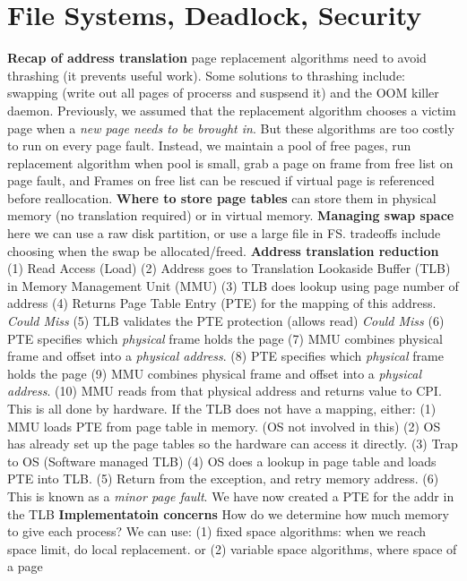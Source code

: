 \section{File Systems, Deadlock, Security}
{\bf Recap of address
translation}
page replacement algorithms need to avoid thrashing (it prevents useful work). Some solutions
to thrashing include: swapping (write out all pages of procerss and suspsend it) and the OOM killer daemon.
Previously, we assumed that the replacement algorithm chooses a victim page
when a \emph{new page needs to be brought in}. But these algorithms are too
costly to run on every page fault. Instead, we maintain a pool of free pages,
run replacement algorithm when pool is small, grab a page on frame from free
list on page fault, and Frames on free list can be rescued if virtual page is
referenced before reallocation.
{\bf Where to store page
tables } can store them in physical memory (no translation required) or in virtual memory.
{\bf Managing swap space} here we can use a raw disk partition, or use a large
file in FS. tradeoffs include choosing when the swap be allocated/freed.  {\bf
Address translation reduction} (1)  Read Access (Load)
  (2) Address goes to Translation Lookaside Buffer (TLB) in Memory
  Management Unit (MMU)
  (3) TLB does lookup using page number of address
  (4) Returns Page Table Entry (PTE) for the mapping of this address.
    \emph{Could Miss}
  (5)  TLB validates the PTE protection (allows read) \emph{Could Miss}
    (6)  PTE specifies which \emph{physical} frame holds the page
    (7) MMU combines physical frame and offset into a \emph{physical
    address}.
    (8) PTE specifies which \emph{physical} frame holds the page
    (9) MMU combines physical frame and offset into a \emph{physical
    address}.
    (10) MMU reads from that physical address and returns value to CPI.
  This is all done by hardware.
  If the TLB does not have a mapping, either:
    (1)  MMU loads PTE from page table in memory. (OS not involved in this)
    (2) OS has already set up the page tables so the hardware can access it
    directly.
    (3) Trap to OS (Software managed TLB)
    (4) OS does a lookup in page table and loads PTE into TLB.
    (5) Return from the exception, and retry memory address.
    (6) This is known as a \emph{minor page fault}. We have now created a
    PTE for the addr in the TLB
{\bf Implementatoin concerns} How do we determine how much memory to give each
process? We can use: (1) fixed space algorithms: when we reach space limit, do
local replacement. or (2) variable space algorithms, where space of a page
